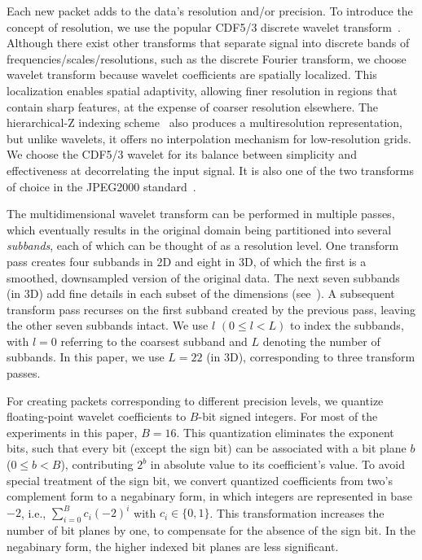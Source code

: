 Each new packet adds to the data's resolution and/or precision. To introduce the concept of
resolution, we use the popular CDF5/3 discrete wavelet transform~\cite{cdf-wavelets}. Although there
exist other transforms that separate signal into discrete bands of frequencies/scales/resolutions,
such as the discrete Fourier transform, we choose wavelet transform because wavelet coefficients are
spatially localized. This localization enables spatial adaptivity, allowing finer resolution in
regions that contain sharp features, at the expense of coarser resolution elsewhere. The
hierarchical-Z indexing scheme~\cite{idx2001} also produces a multiresolution representation, but
unlike wavelets, it offers no interpolation mechanism for low-resolution grids. We choose the CDF5/3
wavelet for its balance between simplicity and effectiveness at decorrelating the input signal. It
is also one of the two transforms of choice in the JPEG2000 standard~\cite{jpeg2000}.

The multidimensional wavelet transform can be performed in multiple passes, which eventually results
in the original domain being partitioned into several \emph{subbands}, each of which can be thought
of as a resolution level. One transform pass creates four subbands in 2D and eight in 3D, of which
the first is a smoothed, downsampled version of the original data. The next seven subbands (in 3D)
add fine details in each subset of the dimensions (see~). A subsequent transform
pass recurses on the first subband created by the previous pass, leaving the other seven subbands
intact. We use $l$ $(0 \leq l < L)$ to index the subbands, with $l = 0$ referring to the coarsest
subband and $L$ denoting the number of subbands. In this paper, we use $L=22$ (in 3D), corresponding
to three transform passes.

For creating packets corresponding to different precision levels, we quantize floating-point wavelet
coefficients to $B$-bit signed integers. For most of the experiments in this paper, $B=16$. This
quantization eliminates the exponent bits, such that every bit (except the sign bit) can be
associated with a bit plane $b$ ($0\leq b < B$), contributing $2^b$ in absolute value to its
coefficient's value. To avoid special treatment of the sign bit, we convert quantized coefficients
from two's complement form to a negabinary form, in which integers are represented in base $-2$,
i.e., $\sum_{i=0}^{B}{c_i(-2)^i}$ with $c_i\in \{0,1\}$. This transformation increases the number of
bit planes by one, to compensate for the absence of the sign bit. In the negabinary form, the higher
indexed bit planes are less significant.

